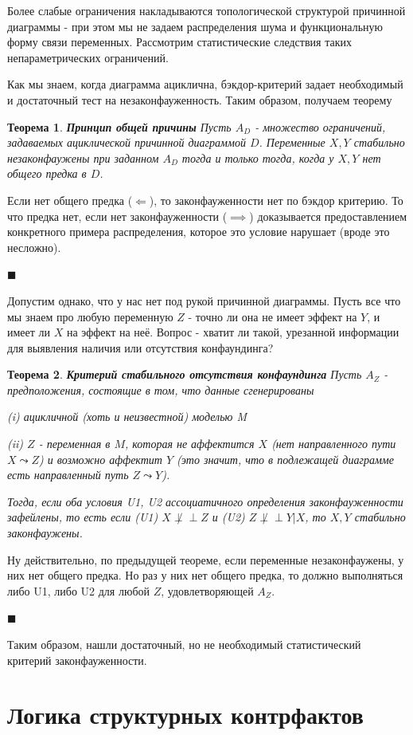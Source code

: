 \documentclass[fleqn]{article}
\newcommand{\independent}{\perp \!\!\! \perp}
\newtheorem{theorem}{Теорема}
\numberwithin{equation}{section}
\numberwithin{theorem}{section}
\numberwithin{figure}{section}
\numberwithin{lemma}{section}
\numberwithin{corollary}{section}
\begin{document}
Более слабые ограничения накладываются топологической структурой причинной диаграммы - при этом мы не задаем распределения шума и функциональную форму связи переменных. Рассмотрим статистические следствия таких непараметрических ограничений.

Как мы знаем, когда диаграмма ациклична, бэкдор-критерий задает необходимый и достаточный тест на незаконфауженность. Таким образом, получаем теорему

\begin{theorem}
\textbf{Принцип общей причины} Пусть $A_D$ - множество ограничений, задаваемых ациклической причинной диаграммой $D$. Переменные $X,Y$ стабильно незаконфаужены при заданном $A_D$ тогда и только тогда, когда у $X, Y$ нет общего предка в $D$.
\end{theorem}

Если нет общего предка ($\Leftarrow$), то законфауженности нет по бэкдор критерию. То что предка нет, если нет законфауженности ($\implies$) доказывается предоставлением конкретного примера распределения, которое это условие нарушает (вроде это несложно).

$\blacksquare$

Допустим однако, что у нас нет под рукой причинной диаграммы. Пусть все что мы знаем про любую переменную $Z$ - точно ли она не имеет эффект на $Y$, и имеет ли $X$ на эффект на неё. Вопрос - хватит ли такой, урезанной информации для выявления наличия или отсутствия конфаундинга?

\begin{theorem}
\textbf{Критерий стабильного отсутствия конфаундинга} Пусть  $A_Z$ - предположения, состоящие в том, что данные сгенерированы

(i) ацикличной (хоть и неизвестной) моделью M

(ii) $Z$ - переменная в $M$, которая не аффектится $X$ (нет направленного пути $X \leadsto Z$) и возможно аффектит $Y$ (это значит, что в подлежащей диаграмме есть направленный путь $Z \leadsto Y$). 

Тогда, если оба условия U1, U2 ассоциатичного определения законфауженности зафейлены, то есть если (U1) $X \not \independent Z$ и (U2) $Z \not \independent Y | X$, то $X, Y$ стабильно законфаужены.
\end{theorem}

Ну действительно, по предыдущей теореме, если переменные незаконфаужены, у них нет общего предка. Но раз у них нет общего предка, то должно выполняться либо U1, либо U2 для любой $Z$, удовлетворяющей $A_Z$.

$\blacksquare$

Таким образом, нашли достаточный, но не необходимый статистический критерий законфауженности.


\section{Логика структурных контрфактов}
\end{document}
